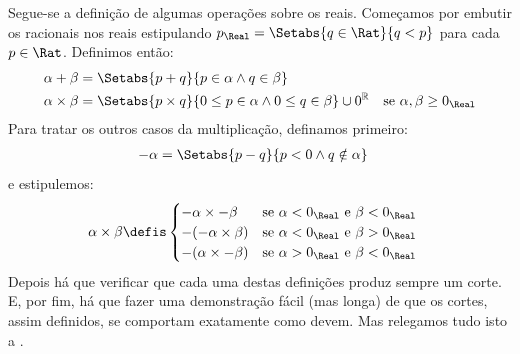 \documentclass[../../../include/open-logic-section]{subfiles}
\begin{document}
Segue-se a definição de algumas operações sobre os reais. Começamos por embutir os
racionais nos reais estipulando $p_\Real =
\Setabs{q \in \Rat}{q < p}$ para cada $p \in \Rat$. Definimos então:
\begin{align*}
	\alpha + \beta &= \Setabs{p + q}{p \in \alpha \land q \in \beta}\\
	\alpha \times \beta &= 
	\Setabs{p \times q}{0 \leq p \in \alpha \land 0 \leq q \in \beta} \cup 0^\mathbb{R} & \text{se }\alpha, \beta \geq 0_\Real
\end{align*}
Para tratar os outros casos da multiplicação, definamos primeiro:
\begin{align*}
	-\alpha &= \Setabs{p - q}{p < 0 \land q \notin \alpha}
\end{align*}
e estipulemos:
\begin{align*}
	\alpha \times \beta &\defis 
	\begin{cases}
		\mathord{-}\alpha \times \mathord{-}\beta &\text{se }\alpha < 0_\Real\text{ e }\beta < 0_\Real\\
		\mathord{-}(\mathord{-}\alpha \times \beta) &\text{se }\alpha < 0_\Real \text{ e }\beta > 0_\Real\\
		\mathord{-}(\alpha \times \mathord{-}\beta) &\text{se }\alpha > 0_\Real \text{ e }\beta < 0_\Real
	\end{cases}
\end{align*}
Depois há que verificar que cada uma destas definições produz sempre um corte. E,
por fim, há que fazer uma demonstração fácil (mas longa) de que os cortes, assim
definidos, se comportam exatamente como devem. Mas relegamos tudo isto a
.
\end{document}
